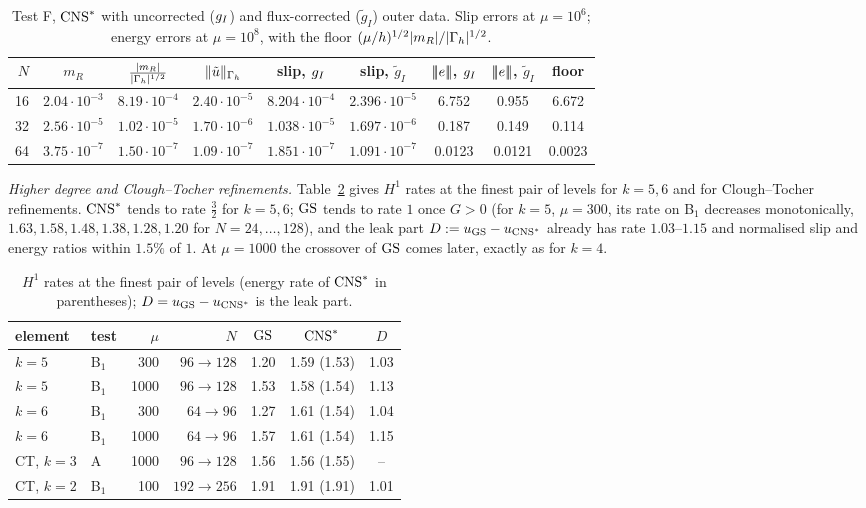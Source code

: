 \begin{table}[t]
\centering\small
\caption{Test F, $\mathrm{CNS}^\ast$ with uncorrected ($g_I$) and flux-corrected ($\tilde g_I$) outer data. Slip errors at $\mu=10^6$; energy errors at $\mu=10^8$, with the floor $(\mu/h)^{1/2}|m_R|/|\Gamma_h|^{1/2}$.}\label{tab:flux}
\setlength{\tabcolsep}{4pt}
\begin{tabular}{rcccccccc}
\toprule
$N$ & $m_R$ & $\frac{|m_R|}{|\Gamma_h|^{1/2}}$ & $\lVert \tilde u\rVert_{\Gamma_h}$ & slip, $g_I$ & slip, $\tilde g_I$ & $|\!|\!|e|\!|\!|$, $g_I$ & $|\!|\!|e|\!|\!|$, $\tilde g_I$ & floor\\
\midrule
16 & $2.04\cdot10^{-3}$ & $8.19\cdot10^{-4}$ & $2.40\cdot10^{-5}$ & $8.204\cdot10^{-4}$ & $2.396\cdot10^{-5}$ & 6.752 & 0.955 & 6.672\\
32 & $2.56\cdot10^{-5}$ & $1.02\cdot10^{-5}$ & $1.70\cdot10^{-6}$ & $1.038\cdot10^{-5}$ & $1.697\cdot10^{-6}$ & 0.187 & 0.149 & 0.114\\
64 & $3.75\cdot10^{-7}$ & $1.50\cdot10^{-7}$ & $1.09\cdot10^{-7}$ & $1.851\cdot10^{-7}$ & $1.091\cdot10^{-7}$ & 0.0123 & 0.0121 & 0.0023\\
\bottomrule
\end{tabular}
\end{table}

\emph{Higher degree and Clough--Tocher refinements.} Table~\ref{tab:ratesv3} gives $H^1$ rates at the finest pair of levels for $k=5,6$ and for Clough--Tocher refinements. $\mathrm{CNS}^\ast$ tends to rate $\frac32$ for $k=5,6$; $\mathrm{GS}$ tends to rate $1$ once $G>0$ (for $k=5$, $\mu=300$, its rate on B$_1$ decreases monotonically, $1.63,1.58,1.48,1.38,1.28,1.20$ for $N=24,\dots,128$), and the leak part $D:=u_{\mathrm{GS}}-u_{\mathrm{CNS}^\ast}$ already has rate $1.03$--$1.15$ and normalised slip and energy ratios within $1.5\%$ of $1$. At $\mu=1000$ the crossover of $\mathrm{GS}$ comes later, exactly as for $k=4$.

\begin{table}[t]
\centering\small
\caption{$H^1$ rates at the finest pair of levels (energy rate of $\mathrm{CNS}^\ast$ in parentheses); $D=u_{\mathrm{GS}}-u_{\mathrm{CNS}^\ast}$ is the leak part.}\label{tab:ratesv3}
\begin{tabular}{llrrccc}
\toprule
element & test & $\mu$ & $N$ & $\mathrm{GS}$ & $\mathrm{CNS}^\ast$ & $D$\\
\midrule
$k=5$ & B$_1$ & 300 & $96\to128$ & 1.20 & 1.59 (1.53) & 1.03\\
$k=5$ & B$_1$ & 1000 & $96\to128$ & 1.53 & 1.58 (1.54) & 1.13\\
$k=6$ & B$_1$ & 300 & $64\to96$ & 1.27 & 1.61 (1.54) & 1.04\\
$k=6$ & B$_1$ & 1000 & $64\to96$ & 1.57 & 1.61 (1.54) & 1.15\\
CT, $k=3$ & A & 1000 & $96\to128$ & 1.56 & 1.56 (1.55) & --\\
CT, $k=2$ & B$_1$ & 100 & $192\to256$ & 1.91 & 1.91 (1.91) & 1.01\\
\bottomrule
\end{tabular}
\end{table}

